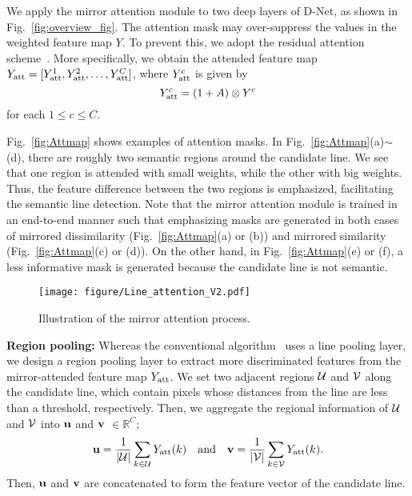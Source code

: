 \documentclass[runningheads]{llncs}
\begin{document}
We apply the mirror attention module to two deep layers of D-Net, as shown in Fig.~\ref{fig:overview_fig}. The attention mask may over-suppress the values in the weighted feature map $Y$. To prevent this, we adopt the residual attention scheme~\cite{wang2017}. More specifically, we obtain the attended feature map $Y_{\rm att} = [Y^1_{\rm att}, Y^2_{\rm att}, \ldots, Y^C_{\rm att}]$, where $Y^c_{\rm att}$ is given by
\begin{equation}\label{eq:residual_attention}
    Y^c_{\rm att} = (1 + A) \otimes Y^c
\end{equation}
for each $1\leq c \leq C$.

Fig.~\ref{fig:Attmap} shows examples of attention masks. In Fig.~\ref{fig:Attmap}(a)$\sim$(d), there are roughly two semantic regions around the candidate line. We see that one region is attended with small weights, while the other with big weights. Thus, the feature difference between the two regions is emphasized, facilitating the semantic line detection. Note that the mirror attention module is trained in an end-to-end manner such that emphasizing masks are generated in both cases of mirrored dissimilarity (Fig.~\ref{fig:Attmap}(a) or (b)) and mirrored similarity (Fig.~\ref{fig:Attmap}(c) or (d)). On the other hand, in Fig.~\ref{fig:Attmap}(e) or (f), a less informative mask is generated because the candidate line is not semantic.

\begin{figure*}[t]

  \centering
  \texttt{[image: figure/Line\_attention\_V2.pdf]}


  \caption{Illustration of the mirror attention process.}
  \label{fig:mirror_attention}

\end{figure*}



\noindent\textbf{Region pooling:} Whereas the conventional algorithm~\cite{lee2017} uses a line pooling layer, we design a region pooling layer to extract more discriminated features from the mirror-attended feature map $Y_{\rm att}$. We set two adjacent regions ${\cal U}$ and ${\cal V}$ along the candidate line, which contain pixels whose distances from the line are less than a threshold, respectively. Then, we aggregate the regional information of ${\cal U}$ and ${\cal V}$ into $\bf u$ and $\bf v$ $\in \mathbb{R}^C$;
\begin{equation}
    {\bf u} = \frac{1}{|{\cal U}|}\sum_{{k} \in {\cal U}}{Y_{\rm att}({k})} \quad \mbox{and} \quad
    {\bf v} = \frac{1}{|{\cal V}|}\sum_{{k} \in {\cal V}}{Y_{\rm att}({k})}.
\end{equation}
Then, $\bf u$ and $\bf v$ are concatenated to form the feature vector of the candidate line.
\end{document}
